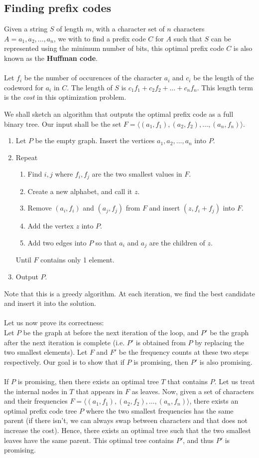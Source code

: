 \documentclass[a4paper]{article}
\begin{document}
\subsection{Finding prefix codes}
Given a string $S$ of length $m$, with a character set of $n$ characters $A={a_1, a_2, \dots, a_n}$, we with to find a prefix code $C$ for $A$ such that $S$ can be represented using the minimum number of bits, this optimal prefix code $C$ is also known as the \textbf{Huffman code}.\\\\
Let $f_i$ be the number of occurences of the character $a_i$ and $c_i$ be the length of the codeword for $a_i$ in $C$. The length of $S$ is $c_1f_1 + c_2f_2 + \dots + c_nf_n$. This length term is the \textit{cost} in this optimization problem.

We shall sketch an algorithm that outputs the optimal prefix code as a full binary tree. Our input shall be the set $F = \langle (a_1,f_1), (a_2, f_2), \dots, (a_n, f_n)\rangle$.
\begin{enumerate}
	\item Let $P$ be the empty graph. Insert the vertices $a_1, a_2, \dots, a_n$ into $P$.
	\item Repeat
	\begin{enumerate}
		\item Find $i, j$ where $f_i, f_j$ are the two smallest values in $F$.
		\item Create a new alphabet, and call it $z$.
		\item Remove $(a_i, f_i)$ and $(a_j, f_j)$ from $F$ and insert $(z, f_i+f_j)$ into $F$.
		\item Add the vertex $z$ into $P$.
		\item Add two edges into $P$ so that $a_i$ and $a_j$ are the children of $z$.
	\end{enumerate}
	Until $F$ contains only 1 element.
	\item Output $P$.
\end{enumerate}
Note that this is a greedy algorithm. At each iteration, we find the best candidate and insert it into the solution.\\\\
Let us now prove its correctness:\\
Let $P$ be the graph at before the next iteration of the loop, and $P'$ be the graph after the next iteration is complete (i.e. $P'$ is obtained from $P$ by replacing the two smallest elements). Let $F$ and $F'$ be the frequency counts at these two steps respectively. Our goal is to show that if $P$ is promising, then $P'$ is also promising.\\\\
If $P$ is promising, then there exists an optimal tree $T$ that contains $P$. Let us treat the internal nodes in $T$ that appears in $F$ as leaves. Now, given a set of characters and their frequencies $F = \langle (a_1,f_1), (a_2, f_2), \dots, (a_n, f_n)\rangle$, there exists an optimal prefix code tree $P$ where the two smallest frequencies has the same parent (if there isn't, we can always swap between characters and that does not increase the cost). Hence, there exists an optimal tree such that the two smallest leaves have the same parent. This optimal tree contains $P'$, and thus $P'$ is promising.
\end{document}
